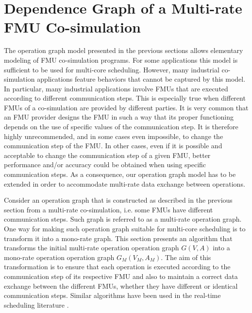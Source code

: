 \section{\label{sec:opgraph}Dependence Graph of a Multi-rate FMU Co-simulation}

The operation graph model presented in the previous sections allows elementary modeling of FMU co-simulation programs. For some applications this model is sufficient to be used for multi-core scheduling. However, many industrial co-simulation applications feature behaviors that cannot be captured by this model. In particular, many industrial applications involve FMUs that are executed according to different communication steps. This is especially true when different FMUs of a co-simulation are provided by different parties. It is very common that an FMU provider designs the FMU in such a way that its proper functioning depends on the use of specific values of the communication step. It is therefore highly unrecommended, and in some cases even impossible, to change the communication step of the FMU. In other cases, even if it is possible and acceptable to change the communication step of a given FMU, better performance and/or accuracy could be obtained when using specific communication steps. As a consequence, our operation graph model has to be extended in order to accommodate multi-rate data exchange between operations. 

Consider an operation graph that is constructed as described in the previous section from a multi-rate co-simulation, i.e. some FMUs have different communication steps. Such graph is referred to as a multi-rate operation graph. One way for making such operation graph suitable for multi-core scheduling is to transform it into a mono-rate graph. This section presents an algorithm that transforms the initial multi-rate operation operation graph $G(V,A)$ into a mono-rate operation operation graph $G_M(V_M,A_M)$. The aim of this transformation is to ensure that each operation is executed according to the communication step of its respective FMU and also to maintain a correct data exchange between the different FMUs, whether they have different or identical communication steps. Similar algorithms have been used in the real-time scheduling literature \cite{kermia:2009, ramamritham:1995}.

